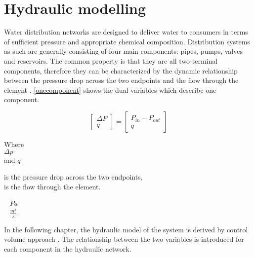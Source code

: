 \section{Hydraulic modelling}
\label{HydraulicModel}

Water distribution networks are designed to deliver water to consumers in terms of sufficient pressure and appropriate chemical composition. Distribution systems as such are generally consisting of four main components: pipes, pumps, valves and reservoirs. The common property is that they are all two-terminal components, therefore they can be characterized by the dynamic relationship between the pressure drop across the two endpoints and the flow through the element \cite{Kallesoe2009}.  \eqref{onecomponent} shows the dual variables which describe one component. 

\begin{equation}
\label{onecomponent}
 \begin{bmatrix}
    \Delta P \\
    q
\end{bmatrix}
=
 \begin{bmatrix}
    P_{in} - P_{out} \\
    q
\end{bmatrix}
\end{equation}

 \begin{minipage}[t]{0.20\textwidth}
Where\\
\hspace*{8mm} $\Delta p$ \\
and \hspace*{0.7mm} $q$ 
\end{minipage}
\begin{minipage}[t]{0.68\textwidth}
\vspace*{2mm}
is the pressure drop across the two endpoints,\\
is the flow through the element.
\end{minipage}
\begin{minipage}[t]{0.10\textwidth}
\vspace*{2mm}
\textcolor{White}{te}$\unit{Pa}$\\
\textcolor{White}{te}$\unit{\frac{m^{3}}{s}}$ 
\end{minipage}

In the following chapter, the hydraulic model of the system is derived by control volume approach \cite{Hunt_Fluidmechanics}. The relationship between the two variables is introduced for each component in the hydraulic network.

